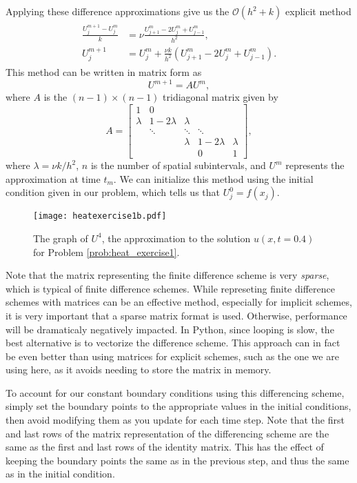\noindent
Applying these difference approximations give us the $\mathcal{O}(h^2 + k)$ explicit method
\begin{align}
	\begin{split}
	\frac{U_{j}^{m+1} - U_{j}^{m}}{k} &= \nu \frac{U_{j+1}^{m}- 2U_{j}^{m} + U_{j-1}^{m} }{h^2} ,\\
	U_{j}^{m+1} &= U_{j}^{m} + \frac{\nu k}{h^2} (U_{j+1}^{m}- 2U_{j}^{m} + U_{j-1}^{m} ).
	\end{split}\label{eqn:firstorder_explicit}
\end{align}
This method can be written in matrix form as
\[U^{m+1} = A U^m,\]
where $A$ is the $(n-1) \times (n-1)$ tridiagonal matrix given by
\[A = \left[\begin{array}{cccccc}1 & 0 & & & \\ \lambda & 1-2\lambda & \lambda & & \\ & \ddots & \ddots & \ddots & \\ & & \lambda & 1-2\lambda & \lambda \\  &  &  & 0 & 1\end{array}\right],\]
where $\lambda = \nu k/h^2$, $n$ is the number of spatial subintervals, and $U^m$ represents the approximation at time $t_m$.
We can initialize this method using the initial condition given in our problem, which tells us that $U_{j}^{0} = f(x_j)$.

\begin{figure}
\centering
\texttt{[image: heatexercise1b.pdf]}
\caption{The graph of $U^{4}$, the approximation to the solution $u(x,t=0.4)$ for Problem \ref{prob:heat_exercise1}.}
\label{fig:heatexercise1b}
\end{figure}

\begin{info}
Note that the matrix representing the finite difference scheme is very \emph{sparse}, which is typical of finite difference schemes.
While represeting finite difference schemes with matrices can be an effective method, especially for implicit schemes, it is very important that a sparse matrix format is used.
Otherwise, performance will be dramaticaly negatively impacted.
In Python, since looping is slow, the best alternative is to vectorize the difference scheme.
This approach can in fact be even better than using matrices for explicit schemes, such as the one we are using here, as it avoids needing to store the matrix in memory.
\end{info}

To account for our constant boundary conditions using this differencing scheme, simply set the boundary points to the appropriate values in the initial conditions, then avoid modifying them as you update for each time step.
Note that the first and last rows of the matrix representation of the differencing scheme are the same as the first and last rows of the identity matrix.
This has the effect of keeping the boundary points the same as in the previous step, and thus the same as in the initial condition.

